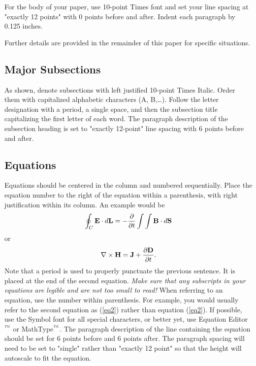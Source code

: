 \documentclass[10pt,conference,letterpaper]{RWWTemplate}
\begin{document}
For the body of your paper, use 10-point Times font and set your line spacing at "exactly 12 points" with 0 points before and after. Indent each paragraph by 0.125 inches.

Further details are provided in the remainder of this paper for specific situations.

\subsection{Major Subsections}
As shown, denote subsections with left justified 10-point Times Italic. Order them with capitalized alphabetic characters (A, B,\dots). Follow the letter designation with a period, a single space, and then the subsection title capitalizing the first letter of each word. The paragraph description of the subsection heading is set to "exactly 12-point" line spacing with 6 points before and after.

\subsection{Equations}
Equations should be centered in the column and numbered sequentially. Place the equation number to the right of the equation within a parenthesis, with right justification within its column. An example would be
\begin{equation}
  \oint_C {\bf E} \cdot d{\bf L} = - \frac{\partial}{\partial t} 
  \int\int {\bf B} \cdot d{\bf S}
  \label{eq1}
\end{equation}
or
\begin{equation}
  \nabla \times {\bf H} = {\bf J} + \frac{\partial{\bf D}}{\partial t}.
  \label{eq2}
\end{equation}
Note that a period is used to properly punctuate the previous sentence. It is placed at the end of the second equation. {\it Make sure that any subscripts in your equations are legible and are not too small to read!} When referring to an equation, use the number within parenthesis. For example, you would usually refer to the second equation as (\ref{eq2}) rather than equation (\ref{eq2}). If possible, use the Symbol font for all special characters, or better yet, use Equation Editor$\textsuperscript{\texttrademark}$ or MathType$\textsuperscript{\texttrademark}$. The paragraph description of the line containing the equation should be set for 6 points before and 6 points after. The paragraph spacing will need to be set to "single" rather than "exactly 12 point" so that the height will autoscale to fit the equation.
\end{document}

